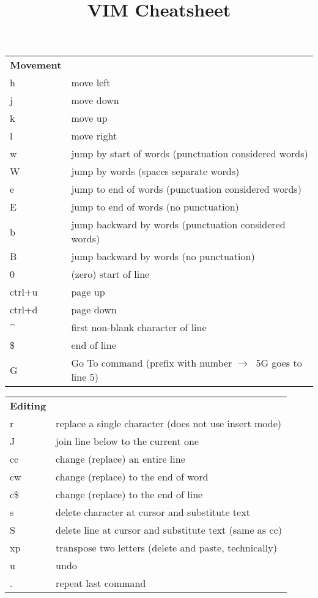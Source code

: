 \documentclass[11pt]{article}
\title{VIM Cheatsheet}
\author{\myname}
\date{}   %
\begin{document}
\maketitle


\setlength{\tabcolsep}{0.5cm}
\centering
{}
\begin{tabular}{| l | l |}
  \hline \hline
  \textbf{Movement} & \\
  h      & move left \\
  j      & move down \\
  k      & move up \\
  l      & move right \\
  w      & jump by start of words (punctuation considered words) \\
  W      & jump by words (spaces separate words) \\
  e      & jump to end of words (punctuation considered words) \\
  E      & jump to end of words (no punctuation) \\
  b      & jump backward by words (punctuation considered words) \\
  B      & jump backward by words (no punctuation) \\
  0      & (zero) start of line \\
  ctrl+u & page up \\
  ctrl+d & page down \\
  \^{}   & first non-blank character of line \\
  \$     & end of line \\
  G      & Go To command (prefix with number  $\to\ $ 5G goes to line 5) \\
  \hline \hline
\end{tabular}

\bigskip\bigskip

\centering
{}
\begin{tabular}{| l | l |}
  \hline \hline
  \textbf{Editing} & \\
  r    & replace a single character (does not use insert mode) \\
  J    & join line below to the current one \\
  cc   & change (replace) an entire line \\
  cw   & change (replace) to the end of word \\
  c\$  & change (replace) to the end of line \\
  s    & delete character at cursor and substitute text \\
  S    & delete line at cursor and substitute text (same as cc) \\
  xp   & transpose two letters (delete and paste, technically) \\
  u    & undo \\
  .    & repeat last command \\
  \hline \hline
\end{tabular}
\end{document}
